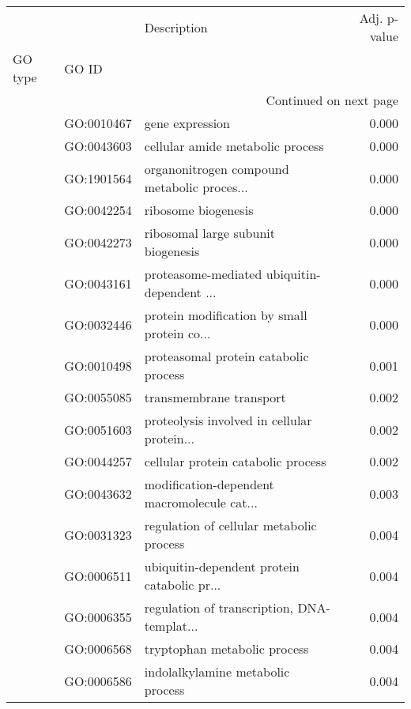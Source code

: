\begin{longtable}{lllr}
\toprule
   &            &                                  Description &  Adj. p-value \\
GO type & GO ID &                                              &               \\
\midrule
\endhead
\midrule
\multicolumn{4}{r}{{Continued on next page}} \\
\midrule
\endfoot

\bottomrule
\endlastfoot
\multirow{91}{*}{BP} & GO:0010467 &                              gene expression &         0.000 \\
   & GO:0043603 &             cellular amide metabolic process &         0.000 \\
   & GO:1901564 &  organonitrogen compound metabolic proces... &         0.000 \\
   & GO:0042254 &                          ribosome biogenesis &         0.000 \\
   & GO:0042273 &           ribosomal large subunit biogenesis &         0.000 \\
   & GO:0043161 &  proteasome-mediated ubiquitin-dependent ... &         0.000 \\
   & GO:0032446 &  protein modification by small protein co... &         0.000 \\
   & GO:0010498 &        proteasomal protein catabolic process &         0.001 \\
   & GO:0055085 &                      transmembrane transport &         0.002 \\
   & GO:0051603 &  proteolysis involved in cellular protein... &         0.002 \\
   & GO:0044257 &           cellular protein catabolic process &         0.002 \\
   & GO:0043632 &  modification-dependent macromolecule cat... &         0.003 \\
   & GO:0031323 &     regulation of cellular metabolic process &         0.004 \\
   & GO:0006511 &  ubiquitin-dependent protein catabolic pr... &         0.004 \\
   & GO:0006355 &  regulation of transcription, DNA-templat... &         0.004 \\
   & GO:0006568 &                 tryptophan metabolic process &         0.004 \\
   & GO:0006586 &            indolalkylamine metabolic process &         0.004 \\

\end{longtable}
